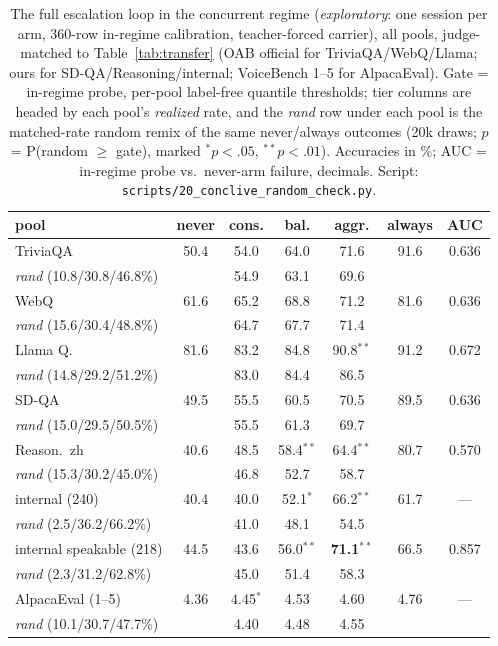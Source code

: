 \begin{table}[h]
\centering\footnotesize
\setlength{\tabcolsep}{4pt}
\caption{The full escalation loop in the concurrent regime
(\emph{exploratory}: one session per arm, 360-row in-regime
calibration, teacher-forced carrier), all pools, judge-matched to
Table~\ref{tab:transfer} (OAB official for TriviaQA/WebQ/Llama; ours
for SD-QA/Reasoning/internal; VoiceBench 1--5 for AlpacaEval). Gate =
in-regime probe, per-pool label-free quantile thresholds; tier columns
are headed by each pool's \emph{realized} rate, and the \emph{rand}
row under each pool is the matched-rate random remix of the same
never/always outcomes (20k draws; $p$ = P(random $\ge$ gate), marked
$^{*}p{<}.05$, $^{**}p{<}.01$). Accuracies in \%; AUC = in-regime
probe vs.\ never-arm failure, decimals.
Script: \texttt{scripts/20\_conclive\_random\_check.py}.}
\label{tab:conclive}
\begin{tabular}{lcccccc}
\toprule
pool & never & cons. & bal. & aggr. & always & AUC \\
\midrule
TriviaQA & 50.4 & 54.0 & 64.0 & 71.6 & 91.6 & 0.636 \\
\;\emph{rand} (10.8/30.8/46.8\%) & & 54.9 & 63.1 & 69.6 & & \\
WebQ & 61.6 & 65.2 & 68.8 & 71.2 & 81.6 & 0.636 \\
\;\emph{rand} (15.6/30.4/48.8\%) & & 64.7 & 67.7 & 71.4 & & \\
Llama Q. & 81.6 & 83.2 & 84.8 & 90.8$^{**}$ & 91.2 & 0.672 \\
\;\emph{rand} (14.8/29.2/51.2\%) & & 83.0 & 84.4 & 86.5 & & \\
SD-QA & 49.5 & 55.5 & 60.5 & 70.5 & 89.5 & 0.636 \\
\;\emph{rand} (15.0/29.5/50.5\%) & & 55.5 & 61.3 & 69.7 & & \\
Reason.\ zh & 40.6 & 48.5 & 58.4$^{**}$ & 64.4$^{**}$ & 80.7 & 0.570 \\
\;\emph{rand} (15.3/30.2/45.0\%) & & 46.8 & 52.7 & 58.7 & & \\
\midrule
internal (240) & 40.4 & 40.0 & 52.1$^{*}$ & 66.2$^{**}$ & 61.7 & --- \\
\;\emph{rand} (2.5/36.2/66.2\%) & & 41.0 & 48.1 & 54.5 & & \\
internal speakable (218) & 44.5 & 43.6 & 56.0$^{**}$ & \textbf{71.1}$^{**}$ & 66.5 & 0.857 \\
\;\emph{rand} (2.3/31.2/62.8\%) & & 45.0 & 51.4 & 58.3 & & \\
AlpacaEval (1--5) & 4.36 & 4.45$^{*}$ & 4.53 & 4.60 & 4.76 & --- \\
\;\emph{rand} (10.1/30.7/47.7\%) & & 4.40 & 4.48 & 4.55 & & \\
\bottomrule
\end{tabular}
\end{table}

